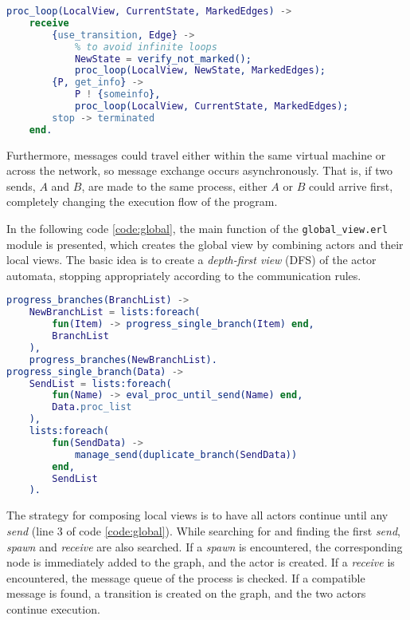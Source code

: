\begin{lstlisting}[language=Erlang, caption=Pseudocode of \texttt{proc\_loop} function]
proc_loop(LocalView, CurrentState, MarkedEdges) ->
    receive
        {use_transition, Edge} ->
            % to avoid infinite loops
            NewState = verify_not_marked();
            proc_loop(LocalView, NewState, MarkedEdges);
        {P, get_info} ->
            P ! {someinfo},
            proc_loop(LocalView, CurrentState, MarkedEdges);
        stop -> terminated
    end.
\end{lstlisting}

Furthermore, messages could travel either within the same virtual machine or across the network, so message exchange occurs asynchronously. That is, if two sends, $A$ and $B$, are made to the same process, either $A$ or $B$ could arrive first, completely changing the execution flow of the program.

In the following code \ref{code:global}, the main function of the \texttt{global\_view.erl} module is presented, which creates the global view by combining actors and their local views. The basic idea is to create a \textit{depth-first view} (DFS) of the actor automata, stopping appropriately according to the communication rules.

\begin{lstlisting}[language=Erlang, caption=Main function for globalview construction, label=code:global]
progress_branches(BranchList) ->
    NewBranchList = lists:foreach(
        fun(Item) -> progress_single_branch(Item) end,
        BranchList
    ),
    progress_branches(NewBranchList).
progress_single_branch(Data) ->
    SendList = lists:foreach(
        fun(Name) -> eval_proc_until_send(Name) end,
        Data.proc_list
    ),
    lists:foreach(
        fun(SendData) -> 
            manage_send(duplicate_branch(SendData))
        end,
        SendList
    ).
\end{lstlisting}

The strategy for composing local views is to have all actors continue until any \textit{send} (line 3 of code \ref{code:global}). While searching for and finding the first \textit{send}, \textit{spawn} and \textit{receive} are also searched. If a \textit{spawn} is encountered, the corresponding node is immediately added to the graph, and the actor is created. If a \textit{receive} is encountered, the message queue of the process is checked. If a compatible message is found, a transition is created on the graph, and the two actors continue execution.

